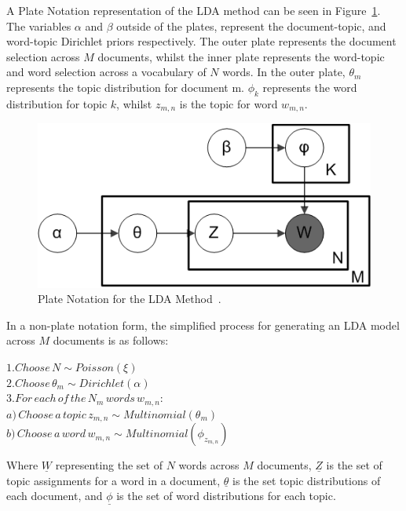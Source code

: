 \documentclass[10pt]{report}
\begin{document}
A Plate Notation representation of the LDA method can be seen in Figure~\ref{fig:lda_plate}. The variables $\alpha$ and $\beta$ outside of the plates, represent the document-topic, and word-topic Dirichlet priors respectively. The outer plate represents the document selection across $M$ documents, whilst the inner plate represents the word-topic and word selection across a vocabulary of $N$ words. In the outer plate, $\theta_m$ represents the topic distribution for document m. $\phi_k$ represents the word distribution for topic $k$, whilst $z_{m,n}$ is the topic for word $w_{m,n}$.

\begin {figure}[h!]
  \centering
  \includegraphics[scale=0.5]{lda_plate}
  \caption{Plate Notation for the LDA Method~\cite{Bkkbrad2018-yt}.
    \label{fig:lda_plate}}
\end{figure}

\newpage
\renewcommand{\baselinestretch}{2.0}\normalsize
In a non-plate notation form, the simplified process for generating an LDA model across \(M\) documents is as follows:

\renewcommand{\baselinestretch}{1.0}\normalsize
\(1. Choose\, N \sim Poisson(\xi)\)\\
\(2. Choose\, \theta_m \sim Dirichlet(\alpha)\)\\
\(3. For\, each\, of\, the\, N_m\, words\, w_{m,n}:\)\\
{\hspace*{15mm} \(a)\, Choose\, a\, topic\, z_{m,n} \sim Multinomial(\theta_m)  \)}\\
{\hspace*{15mm} \(b)\, Choose\, a\, word\, w_{m,n} \sim Multinomial(\phi_{z_{m,n}}) \)}

\renewcommand{\baselinestretch}{2.0}\normalsize
Where $\underline{W}$ representing the set of $N$ words across $M$ documents, $\underline{Z}$ is the set of topic assignments for a word in a document, $\underline{\theta}$ is the set topic distributions of each document, and $\underline{\phi}$ is the set of word distributions for each topic.
\end{document}
